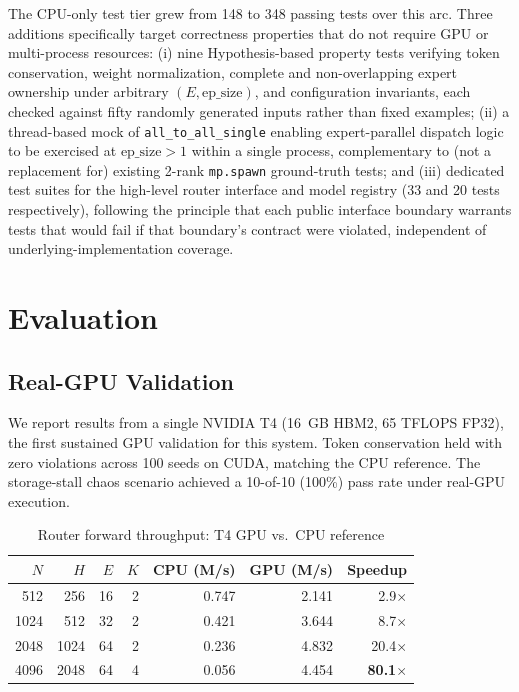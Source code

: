 \documentclass[conference]{IEEEtran}
\begin{document}
The CPU-only test tier grew from 148 to 348 passing tests over this arc.
Three additions specifically target correctness properties that do not
require GPU or multi-process resources: (i) nine Hypothesis-based
property tests verifying token conservation, weight normalization,
complete and non-overlapping expert ownership under arbitrary
$(E, \text{ep\_size})$, and configuration invariants, each checked against
fifty randomly generated inputs rather than fixed examples; (ii) a
thread-based mock of \texttt{all\_to\_all\_single} enabling
expert-parallel dispatch logic to be exercised at $\text{ep\_size}{>}1$
within a single process, complementary to (not a replacement for) existing
2-rank \texttt{mp.spawn} ground-truth tests; and (iii) dedicated test
suites for the high-level router interface and model registry (33 and 20
tests respectively), following the principle that each public interface
boundary warrants tests that would fail if that boundary's contract were
violated, independent of underlying-implementation coverage.

\section{Evaluation}
\label{sec:eval}

\subsection{Real-GPU Validation}

We report results from a single NVIDIA T4 (16~GB HBM2, 65 TFLOPS FP32),
the first sustained GPU validation for this system. Token conservation
held with zero violations across 100 seeds on CUDA, matching the CPU
reference. The storage-stall chaos scenario achieved a 10-of-10 (100\%)
pass rate under real-GPU execution.

\begin{table}[t]
\centering
\caption{Router forward throughput: T4 GPU vs.\ CPU reference}
\label{tab:speedup}
\small
\begin{tabular}{@{}rrrrrrr@{}}
\toprule
$N$ & $H$ & $E$ & $K$ & CPU (M/s) & GPU (M/s) & Speedup \\
\midrule
512  & 256  & 16 & 2 & 0.747 & 2.141 & 2.9$\times$ \\
1024 & 512  & 32 & 2 & 0.421 & 3.644 & 8.7$\times$ \\
2048 & 1024 & 64 & 2 & 0.236 & 4.832 & 20.4$\times$ \\
4096 & 2048 & 64 & 4 & 0.056 & 4.454 & \textbf{80.1$\times$} \\
\bottomrule
\end{tabular}
\end{table}
\end{document}

